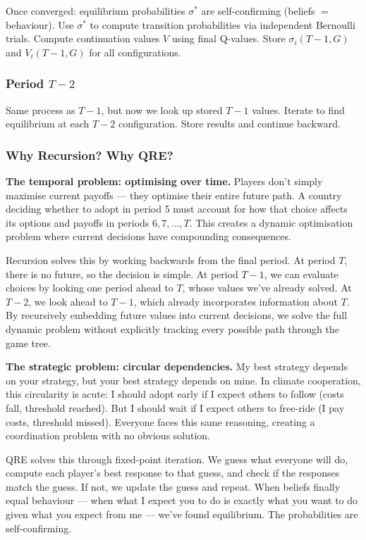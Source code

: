 \documentclass[12pt,a4paper]{article}
\begin{document}
Once converged: equilibrium probabilities $\sigma^*$ are self-confirming (beliefs $=$ behaviour). Use $\sigma^*$ to compute transition probabilities via independent Bernoulli trials. Compute continuation values $V$ using final Q-values. Store $\sigma_i(T-1, G)$ and $V_i(T-1, G)$ for all configurations.

\subsubsection*{Period $T - 2$}

Same process as $T-1$, but now we look up stored $T-1$ values. Iterate to find equilibrium at each $T-2$ configuration. Store results and continue backward.

\subsubsection*{Why Recursion? Why QRE?}

\noindent\textbf{The temporal problem: optimising over time.}
Players don't simply maximise current payoffs --- they optimise their entire future path. A country deciding whether to adopt in period 5 must account for how that choice affects its options and payoffs in periods $6, 7, \ldots, T$. This creates a dynamic optimisation problem where current decisions have compounding consequences.

Recursion solves this by working backwards from the final period. At period $T$, there is no future, so the decision is simple. At period $T-1$, we can evaluate choices by looking one period ahead to $T$, whose values we've already solved. At $T-2$, we look ahead to $T-1$, which already incorporates information about $T$. By recursively embedding future values into current decisions, we solve the full dynamic problem without explicitly tracking every possible path through the game tree.

\noindent\textbf{The strategic problem: circular dependencies.}
My best strategy depends on your strategy, but your best strategy depends on mine. In climate cooperation, this circularity is acute: I should adopt early if I expect others to follow (costs fall, threshold reached). But I should wait if I expect others to free-ride (I pay costs, threshold missed). Everyone faces this same reasoning, creating a coordination problem with no obvious solution.

QRE solves this through fixed-point iteration. We guess what everyone will do, compute each player's best response to that guess, and check if the responses match the guess. If not, we update the guess and repeat. When beliefs finally equal behaviour --- when what I expect you to do is exactly what you want to do given what you expect from me --- we've found equilibrium. The probabilities are self-confirming.
\end{document}

